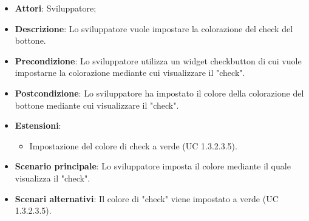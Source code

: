 
\FloatBarrier
\begin{itemize}
\item\textbf{Attori}: Sviluppatore;
\item\textbf{Descrizione}: Lo sviluppatore vuole impostare la colorazione del check del bottone.
\item\textbf{Precondizione}: Lo sviluppatore utilizza un widget checkbutton di cui vuole impostarne la colorazione mediante cui visualizzare il "check".
\item\textbf{Postcondizione}: Lo sviluppatore ha impostato il colore della colorazione del bottone mediante cui visualizzare il "check".
\item \textbf{Estensioni}: 
\begin{itemize}
\item Impostazione del colore di check a verde (UC 1.3.2.3.5).
\end{itemize}
\item\textbf{Scenario principale}: Lo sviluppatore imposta il colore mediante il quale visualizza il "check".
\item\textbf{Scenari alternativi}: Il colore di "check" viene impostato a verde (UC 1.3.2.3.5).
\end{itemize}